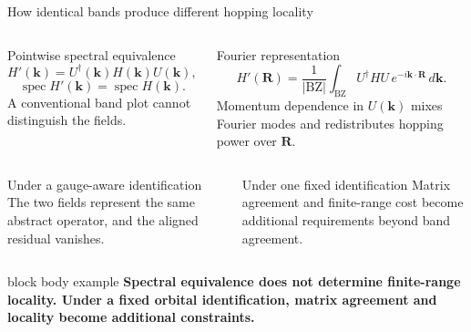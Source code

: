 \documentclass[aspectratio=169,10pt]{beamer}
\begin{document}
\begin{frame}{How identical bands produce different hopping locality}
  \begin{columns}[T]
      \begin{block}{Pointwise spectral equivalence}
        \[
          H'(\mathbf k)=U^\dagger(\mathbf k)H(\mathbf k)U(\mathbf k),
        \]
        \[
          \operatorname{spec}H'(\mathbf k)=\operatorname{spec}H(\mathbf k).
        \]
        A conventional band plot cannot distinguish the fields.
      \end{block}
      \begin{exampleblock}{Fourier representation}
        \[
          H'(\mathbf R)=\frac{1}{|\mathrm{BZ}|}
          \int_{\mathrm{BZ}}U^\dagger H U\,
          e^{-i\mathbf k\cdot\mathbf R}\,d\mathbf k.
        \]
        Momentum dependence in $U(\mathbf k)$ mixes Fourier modes and redistributes
        hopping power over $\mathbf R$.
      \end{exampleblock}
  \end{columns}
  \vspace{0.35em}
  \begin{columns}[T]
      \begin{block}{Under a gauge-aware identification}
        The two fields represent the same abstract operator, and the aligned residual
        vanishes.
      \end{block}
      \begin{alertblock}{Under one fixed identification}
        Matrix agreement and finite-range cost become additional requirements beyond
        band agreement.
      \end{alertblock}
  \end{columns}
  \vspace{0.12em}
  \begin{beamercolorbox}[rounded=true,sep=0.34em,wd=\textwidth]{block body example}
    \centering\small\bfseries\color{resultblue}
    Spectral equivalence does not determine finite-range locality. Under a fixed orbital
    identification, matrix agreement and locality become additional constraints.
  \end{beamercolorbox}
\end{frame}
\end{document}

